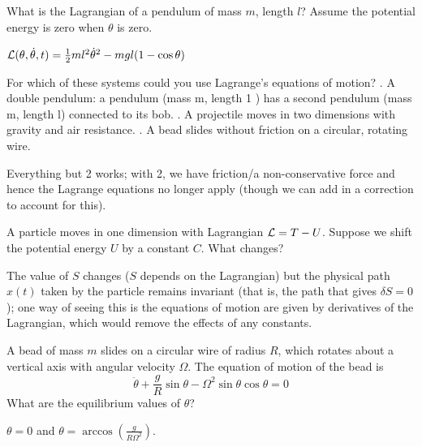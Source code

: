\documentclass[../PHYS306Notes.tex]{subfiles}
\begin{document}
\begin{p}
What is the Lagrangian of a pendulum of mass $m$, length $l$? Assume the potential energy is zero when $\theta$ is zero.
\end{p}
\begin{s}
$\mathcal{L}(\theta, \dot{\theta}, t) = \frac{1}{2}ml^2\dot{\theta}^2 - mgl(1-\cos\theta)$
\end{s}

\begin{p}
For which of these systems could you use Lagrange's equations of motion?
. A double pendulum: a pendulum (mass $\mathrm{m}$, length 1 ) has a second pendulum (mass $\mathrm{m}$, length l) connected to its bob.
. A projectile moves in two dimensions with gravity and air resistance.
. A bead slides without friction on a circular, rotating wire.
\end{p}
\begin{s}
Everything but 2 works; with 2, we have friction/a non-conservative force and hence the Lagrange equations no longer apply (though we can add in a correction to account for this).
\end{s}

\begin{p}
A particle moves in one dimension with Lagrangian $\mathcal{L} = T - U$. Suppose we shift the potential energy $U$ by a constant $C$. What changes?
\end{p}
\begin{s}
The value of $S$ changes ($S$ depends on the Lagrangian) but the physical path $x(t)$ taken by the particle remains invariant (that is, the path that gives $\delta S = 0$); one way of seeing this is the equations of motion are given by derivatives of the Lagrangian, which would remove the effects of any constants.
\end{s}

\begin{p}
A bead of mass $m$ slides on a circular wire of radius $R$, which rotates about a vertical axis with angular velocity $\Omega$. The equation of motion of the bead is \[\ddot{\theta} + \frac{g}{R}\sin\theta - \Omega^2\sin\theta\cos\theta = 0\]
What are the equilibrium values of $\theta$?
\end{p}
\begin{s}
$\theta = 0$ and $\theta = \arccos(\frac{g}{R\Omega^2})$.
\end{s}
\end{document}
